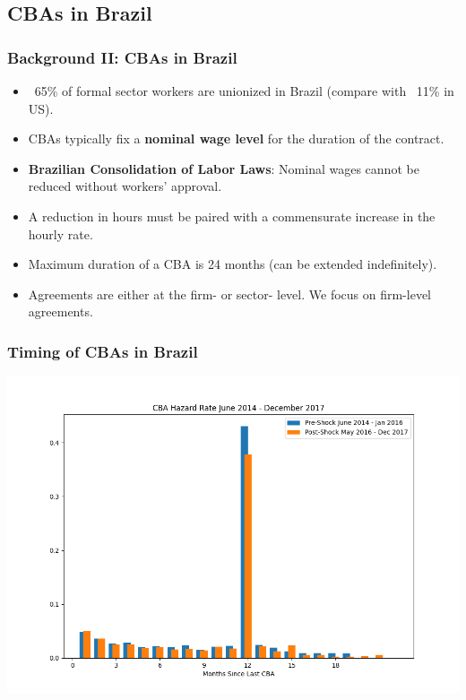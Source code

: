 \documentclass[aspectratio=169]{beamer}
\begin{document}
		\subsection{CBAs in Brazil}		
			\begin{frame}
				\frametitle{Background II: CBAs in Brazil}
				\begin{itemize}
					\item ~65\% of formal sector workers are unionized in Brazil (compare with ~11\% in US).\cite{byjellevisserTrendsCollectiveBargaining2017}
					\item CBAs typically fix a \textbf{nominal wage level} for the duration of the contract. 
					\item \textbf{Brazilian Consolidation of Labor Laws}: Nominal wages cannot be reduced without workers' approval. 
					\item A reduction in hours must be paired with a commensurate increase in the hourly rate.
					\item Maximum duration of a CBA is 24 months (can be extended indefinitely).
					\item Agreements are either at the firm- or sector- level. We focus on firm-level agreements.
				\end{itemize}
			\end{frame}

			\begin{frame}
				\frametitle{Timing of CBAs in Brazil}
				\begin{center}
				\includegraphics[scale=.45]{tables-figures/cba_hazard.png}
				\end{center}
			\end{frame}
\end{document}
